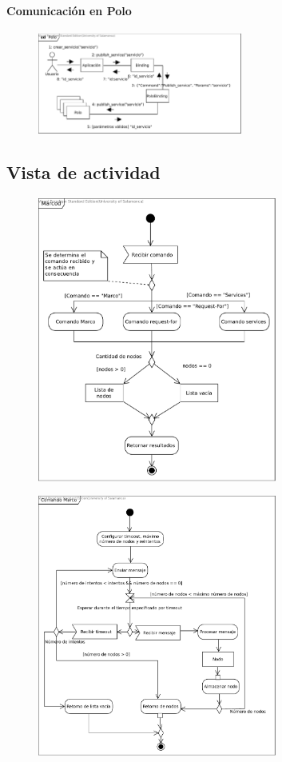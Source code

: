 \documentclass{article}
\begin{document}
\paragraph{Comunicación en Polo}

\begin{figure}[H]
\centering
\includegraphics[width=0.6\textwidth]{Polo}
\end{figure}

\subsection{Vista de actividad}

\begin{figure}[H]
\centering
\includegraphics[width=0.7\textwidth]{Marcod}
\end{figure}

\begin{figure}[H]
\centering
\includegraphics[width=0.7\textwidth]{Comando_Marco}
\end{figure}
\end{document}
